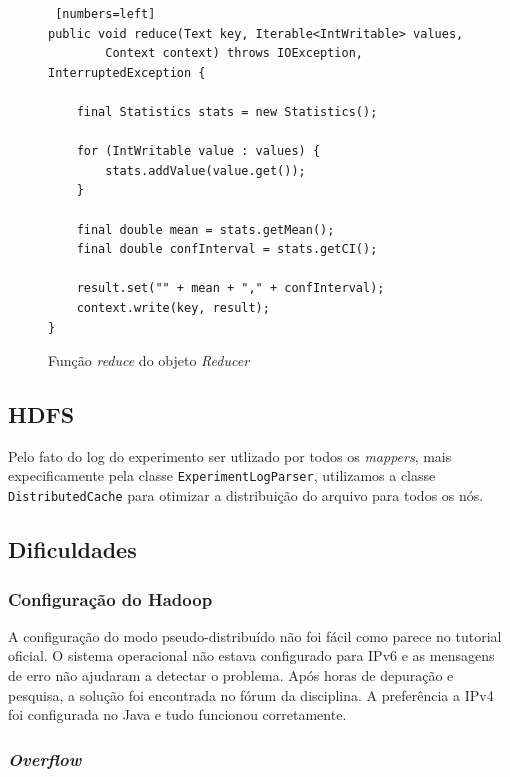 \documentclass[brazil, a4paper,12pt]{article}
\begin{document}
\begin{figure} [!htb]
\begin{center}
\footnotesize
\begin{lstlisting} [numbers=left]
public void reduce(Text key, Iterable<IntWritable> values,
		Context context) throws IOException, InterruptedException {

	final Statistics stats = new Statistics();

	for (IntWritable value : values) {
		stats.addValue(value.get());
	}

	final double mean = stats.getMean();
	final double confInterval = stats.getCI();

	result.set("" + mean + "," + confInterval);
	context.write(key, result);
}
\end{lstlisting}
\end{center}
\caption{Função \emph{reduce} do objeto \emph{Reducer}}
\end{figure}

\subsection {HDFS}

Pelo fato do log do experimento ser utlizado por todos os \emph{mappers}, mais
expecificamente pela classe \verb|ExperimentLogParser|, utilizamos a classe
\verb|DistributedCache| para otimizar a distribuição do arquivo para todos os
nós.

\subsection {Dificuldades}

\subsubsection{Configuração do Hadoop}

A configuração do modo pseudo-distribuído não foi fácil como parece no tutorial
oficial. O sistema operacional não estava configurado para IPv6 e as mensagens
de erro não ajudaram a detectar o problema. Após horas de depuração e pesquisa,
   a solução foi encontrada no fórum da disciplina. A preferência a IPv4 foi
   configurada no Java e tudo funcionou corretamente.

\subsubsection{\emph{Overflow}}
\end{document}
